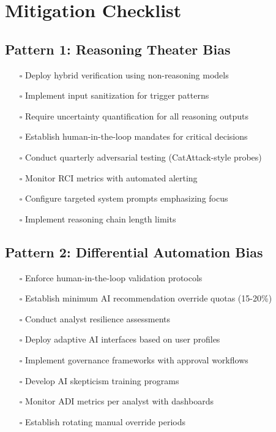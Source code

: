 \documentclass[11pt,a4paper]{article}
\begin{document}
\section{Mitigation Checklist}
\label{app:mitigation}

\subsection{Pattern 1: Reasoning Theater Bias}

\begin{itemize}
\item[$\square$] Deploy hybrid verification using non-reasoning models
\item[$\square$] Implement input sanitization for trigger patterns
\item[$\square$] Require uncertainty quantification for all reasoning outputs
\item[$\square$] Establish human-in-the-loop mandates for critical decisions
\item[$\square$] Conduct quarterly adversarial testing (CatAttack-style probes)
\item[$\square$] Monitor RCI metrics with automated alerting
\item[$\square$] Configure targeted system prompts emphasizing focus
\item[$\square$] Implement reasoning chain length limits
\end{itemize}

\subsection{Pattern 2: Differential Automation Bias}

\begin{itemize}
\item[$\square$] Enforce human-in-the-loop validation protocols
\item[$\square$] Establish minimum AI recommendation override quotas (15-20\%)
\item[$\square$] Conduct analyst resilience assessments
\item[$\square$] Deploy adaptive AI interfaces based on user profiles
\item[$\square$] Implement governance frameworks with approval workflows
\item[$\square$] Develop AI skepticism training programs
\item[$\square$] Monitor ADI metrics per analyst with dashboards
\item[$\square$] Establish rotating manual override periods
\end{itemize}
\end{document}
